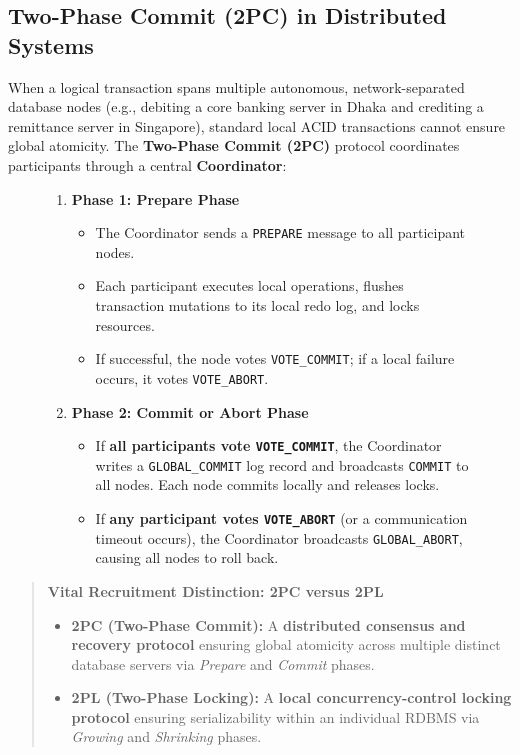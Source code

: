 \subsection{Two-Phase Commit (2PC) in Distributed Systems}
When a logical transaction spans multiple autonomous, network-separated database nodes (e.g., debiting a core banking server in Dhaka and crediting a remittance server in Singapore), standard local ACID transactions cannot ensure global atomicity. The \textbf{Two-Phase Commit (2PC)} protocol coordinates participants through a central \textbf{Coordinator}:

\begin{figure}[htbp]
\centering
\begin{tcolorbox}[colback=codebg, colframe=primary, title=\textbf{The Two Phases of Distributed 2PC Coordination}]
\begin{enumerate}
    \item \textbf{Phase 1: Prepare Phase}
    \begin{itemize}
        \item The Coordinator sends a \texttt{PREPARE} message to all participant nodes.
        \item Each participant executes local operations, flushes transaction mutations to its local redo log, and locks resources.
        \item If successful, the node votes \texttt{VOTE\_COMMIT}; if a local failure occurs, it votes \texttt{VOTE\_ABORT}.
    \end{itemize}
    \item \textbf{Phase 2: Commit or Abort Phase}
    \begin{itemize}
        \item If \textbf{all participants vote \texttt{VOTE\_COMMIT}}, the Coordinator writes a \texttt{GLOBAL\_COMMIT} log record and broadcasts \texttt{COMMIT} to all nodes. Each node commits locally and releases locks.
        \item If \textbf{any participant votes \texttt{VOTE\_ABORT}} (or a communication timeout occurs), the Coordinator broadcasts \texttt{GLOBAL\_ABORT}, causing all nodes to roll back.
    \end{itemize}
\end{enumerate}
\end{tcolorbox}
\end{figure}

\begin{quote}
\textbf{Vital Recruitment Distinction: 2PC versus 2PL}
\begin{itemize}
    \item \textbf{2PC (Two-Phase Commit):} A \textbf{distributed consensus and recovery protocol} ensuring global atomicity across multiple distinct database servers via \textit{Prepare} and \textit{Commit} phases.
    \item \textbf{2PL (Two-Phase Locking):} A \textbf{local concurrency-control locking protocol} ensuring serializability within an individual RDBMS via \textit{Growing} and \textit{Shrinking} phases.
\end{itemize}
\end{quote}

